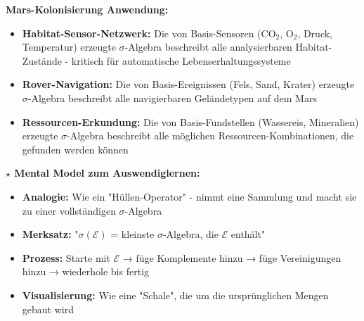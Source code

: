 \begin{denoobification}
\textbf{Mars-Kolonisierung Anwendung:}
\begin{itemize}
    \item \textbf{Habitat-Sensor-Netzwerk:} Die von Basis-Sensoren (CO$_2$, O$_2$, Druck, Temperatur) erzeugte $\sigma$-Algebra beschreibt alle analysierbaren Habitat-Zustände - kritisch für automatische Lebenserhaltungssysteme
    \item \textbf{Rover-Navigation:} Die von Basis-Ereignissen (Fels, Sand, Krater) erzeugte $\sigma$-Algebra beschreibt alle navigierbaren Geländetypen auf dem Mars
    \item \textbf{Ressourcen-Erkundung:} Die von Basis-Fundstellen (Wassereis, Mineralien) erzeugte $\sigma$-Algebra beschreibt alle möglichen Ressourcen-Kombinationen, die gefunden werden können
\end{itemize}

\textbf{$\star$ Mental Model zum Auswendiglernen:}
\begin{itemize}
    \item \textbf{Analogie:} Wie ein "Hüllen-Operator" - nimmt eine Sammlung und macht sie zu einer vollständigen $\sigma$-Algebra
    \item \textbf{Merksatz:} "$\sigma(\mathcal{E})$ = kleinste $\sigma$-Algebra, die $\mathcal{E}$ enthält"
    \item \textbf{Prozess:} Starte mit $\mathcal{E}$ → füge Komplemente hinzu → füge Vereinigungen hinzu → wiederhole bis fertig
    \item \textbf{Visualisierung:} Wie eine "Schale", die um die ursprünglichen Mengen gebaut wird
\end{itemize}

\begin{center}
\end{center}
\end{denoobification}
